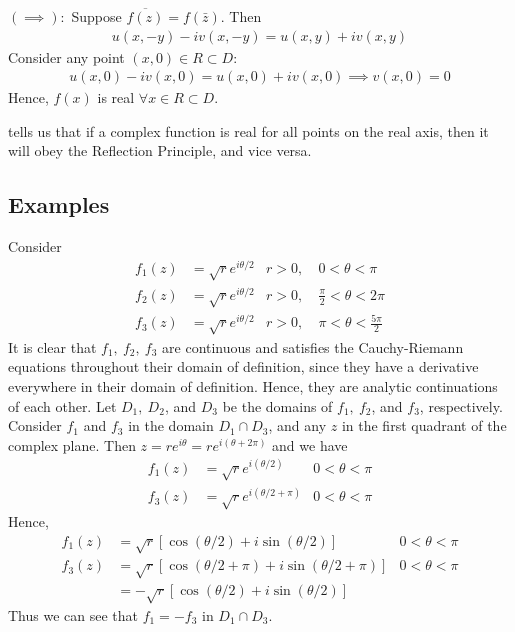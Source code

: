 \documentclass[12pt, english]{book}
\makeatletter
\renewenvironment{proof}[1][\proofname]{\par
	\pushQED{\qed}%
	\normalfont \topsep6\p@\@plus6\p@\relax
	\list{}{%
		\settowidth{\leftmargin}{\itshape\proofname:\hskip\labelsep}%
		\setlength{\labelwidth}{0pt}%
		\setlength{\itemindent}{-\leftmargin}%
	}%
	\item[\hskip\labelsep\itshape#1\@addpunct{:}]\ignorespaces
	}{ \popQED\endlist\@endpefalse}
\makeatother
\begin{document}
\begin{proof}
		
		\underline{\((\implies):\)} \newline
		Suppose \(\overline{f(z)} = f(\bar{z})\). Then 
		\begin{align*}
			u(x, -y) - iv(x, -y) = u(x,y) + iv(x,y)
		\end{align*}
		Consider any point \((x, 0) \in R \subset D\):
		\begin{align*}
			u(x,0) - iv(x, 0) = u(x, 0) + iv(x, 0) \implies v(x, 0) = 0
		\end{align*}
		Hence, \(f(x)\) is real \(\forall x \in R \subset D\).
	\end{proof}

	 tells us that if a complex function is real for all points on the real axis, then it will obey the Reflection Principle, and vice versa.
	
	\subsection{Examples} 
	\begin{example}
		\label{f_1 neq f_3 in analytic continuation Example - Complex}
		Consider 
		\begin{align*}
			f_1(z) &= \sqrt{r} e^{i\theta / 2} & r>0,&\ 0<\theta<\pi \\
			f_2(z) &= \sqrt{r} e^{i\theta / 2} & r>0,&\ \frac{\pi}{2}<\theta<2\pi \\
			f_3(z) &= \sqrt{r} e^{i\theta / 2} & r>0,&\ \pi<\theta<\frac{5\pi}{2} 
		\end{align*}
		{\color{Grey}
		It is clear that \(f_1, \ f_2, \ f_3\) are continuous and satisfies the Cauchy-Riemann equations throughout their domain of definition, since they have a derivative everywhere in their domain of definition. Hence, they are analytic continuations of each other. Let \(D_1, \ D_2\), and \(D_3\) be the domains of \(f_1, \ f_2\), and \(f_3\), respectively. Consider \(f_1\) and \(f_3\) in the domain \(D_1 \cap D_3\), and any \(z\) in the first quadrant of the complex plane. Then \(z = re^{i \theta} = re^{i(\theta + 2\pi)}\)
		and we have
		\begin{align*}
			f_1(z) &= \sqrt{r} e^{i(\theta/2)}  &  0<\theta<\pi \\
			f_3(z) &= \sqrt{r} e^{i(\theta/2 + \pi)}  & 0<\theta<\pi 
		\end{align*}
		Hence, 
		\begin{align*}
			f_1(z) &= \sqrt{r}[\cos(\theta/2) + i\sin(\theta/2)] &  0<\theta<\pi \\
			f_3(z) &= \sqrt{r}[\cos(\theta/2 + \pi) + i\sin(\theta/2+\pi)] & 0<\theta<\pi \\
				   &= - \sqrt{r}[\cos(\theta/2) + i\sin(\theta/2)] 
		\end{align*}
		Thus we can see that \(f_1 = -f_3\) in \(D_1 \cap D_3\).
		}
	\end{example}
\end{document}
